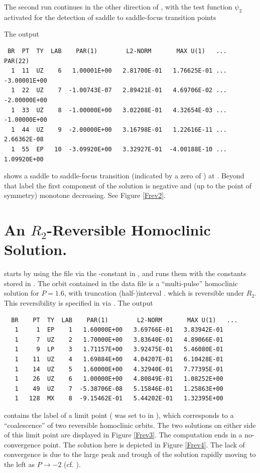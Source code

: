 \documentclass[12pt]{report}
\begin{document}
The second run continues in the other direction of , with
the test function $\psi_2$ activated 
for the detection of saddle to saddle-focus transition points
\begin{center}
\end{center}
The output
\begin{verbatim}
 BR  PT  TY  LAB    PAR(1)        L2-NORM       MAX U(1)   ...   PAR(22)    
  1  11  UZ    6   1.00001E+00   2.81700E-01   1.76625E-01 ... -3.00001E+00
  1  22  UZ    7  -1.00743E-07   2.89421E-01   4.69706E-02 ... -2.00000E+00
  1  33  UZ    8  -1.00000E+00   3.02208E-01   4.32654E-03 ... -1.00000E+00
  1  44  UZ    9  -2.00000E+00   3.16798E-01   1.22616E-11 ...  2.66362E-08
  1  55  EP   10  -3.09920E+00   3.32927E-01  -4.00188E-10 ...  1.09920E+00
\end{verbatim}
shows a saddle to saddle-focus transition 
(indicated by a zero of ) at . Beyond
that label the first component of the solution is negative and (up to the
point of symmetry) monotone decreasing. See Figure \ref{Frev2}.

\section{An $R_2$-Reversible Homoclinic Solution.}

\begin{center}
\end{center}
starts by using the file  via the
 \AUTO-constant in ,
and runs them with the constants stored in . 
The orbit contained in
the data file is a ``multi-pulse'' homoclinic solution for $P=1.6$, with
truncation (half-)interval .
which is reversible under $R_2$. This reversibility is
specified in  via .
The output 
\begin{verbatim}
  BR    PT  TY  LAB    PAR(1)        L2-NORM       MAX U(1)   ...
   1     1  EP    1   1.60000E+00   3.69766E-01   3.83942E-01
   1     7  UZ    2   1.70000E+00   3.83640E-01   4.89066E-01
   1     9  LP    3   1.71157E+00   3.92475E-01   5.46080E-01
   1    11  UZ    4   1.69884E+00   4.04207E-01   6.10428E-01
   1    14  UZ    5   1.60000E+00   4.32940E-01   7.77395E-01
   1    26  UZ    6   1.00000E+00   4.80849E-01   1.08252E+00
   1    49  UZ    7  -5.38706E-08   5.15846E-01   1.25863E+00
   1   128  MX    8  -9.15462E-01   5.44202E-01   1.32395E+00
\end{verbatim}
contains the label of a limit point ( was set to  in
), which corresponds to a ``coalescence'' of two reversible
homoclinic orbits. The two solutions on either side of this limit point are
displayed in Figure \ref{Frev3}. The computation ends in a no-convergence
point. The solution here is depicted in Figure \ref{Frev4}. The lack of
convergence is due to the large peak and trough of the solution rapidly
moving to the left as $P \to -2$ (cf. ).
\end{document}
